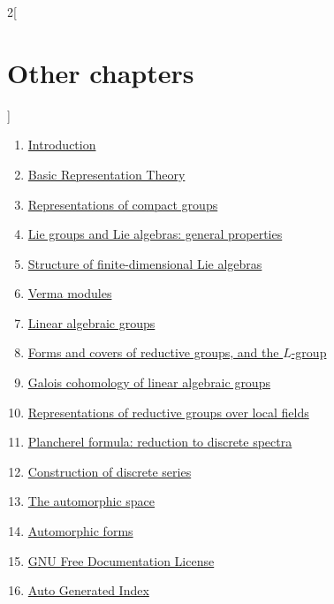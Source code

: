 \begin{multicols}{2}[\section{Other chapters}]
\noindent
\begin{enumerate}
\item \hyperref[introduction-section-phantom]{Introduction}
\item \hyperref[representationtheory-section-phantom]{Basic Representation Theory}
\item \hyperref[representations-compact-section-phantom]{Representations of compact groups}
\item \hyperref[liegroups-general-section-phantom]{Lie groups and Lie algebras: general properties}
\item \hyperref[liestructure-section-phantom]{Structure of finite-dimensional Lie algebras}
\item \hyperref[vermamodules-section-phantom]{Verma modules}
\item \hyperref[algebraicgroups-section-phantom]{Linear algebraic groups}
\item \hyperref[reductiveforms-section-phantom]{Forms and covers of reductive groups, and the $L$-group}
\item \hyperref[galoiscohomology-section-phantom]{Galois cohomology of linear algebraic groups}
\item \hyperref[representations-local-section-phantom]{Representations of reductive groups over local fields}
\item \hyperref[plancherel-section-phantom]{Plancherel formula: reduction to discrete spectra}
\item \hyperref[discreteseries-section-phantom]{Construction of discrete series}
\item \hyperref[automorphicspace-section-phantom]{The automorphic space}
\item \hyperref[automorphicforms-section-phantom]{Automorphic forms}
\item \hyperref[fdl-section-phantom]{GNU Free Documentation License}
\item \hyperref[index-section-phantom]{Auto Generated Index}
\end{enumerate}
\end{multicols}
